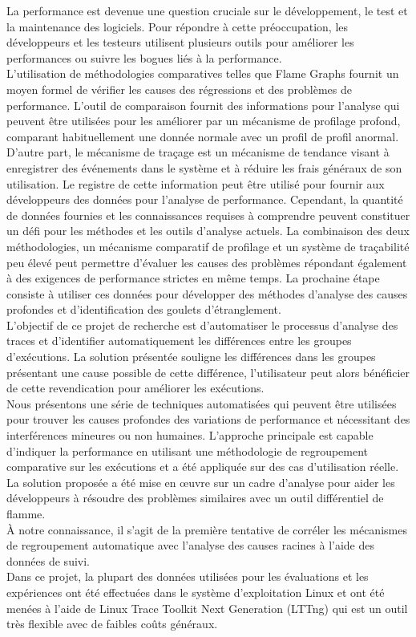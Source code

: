 La performance est devenue une question cruciale sur le développement, le test et la maintenance des logiciels. Pour répondre à cette préoccupation, les développeurs et les testeurs utilisent plusieurs outils pour améliorer les performances ou suivre les bogues liés à la performance.\\
L'utilisation de méthodologies comparatives telles que Flame Graphs fournit un moyen formel de vérifier les causes des régressions et des problèmes de performance. L'outil de comparaison fournit des informations pour l'analyse qui peuvent être utilisées pour les améliorer par un mécanisme de profilage profond, comparant habituellement une donnée normale avec un profil de profil anormal.\\
D'autre part, le mécanisme de traçage est un mécanisme de tendance visant à enregistrer des événements dans le système et à réduire les frais généraux de son utilisation. Le registre de cette information peut être utilisé pour fournir aux développeurs des données pour l'analyse de performance. Cependant, la quantité de données fournies et les connaissances requises à comprendre peuvent constituer un défi pour les méthodes et les outils d'analyse actuels.
La combinaison des deux méthodologies, un mécanisme comparatif de profilage et un système de traçabilité peu élevé peut permettre d'évaluer les causes des problèmes répondant également à des exigences de performance strictes en même temps. La prochaine étape consiste à utiliser ces données pour développer des méthodes d'analyse des causes profondes et d'identification des goulets d'étranglement.\\
L'objectif de ce projet de recherche est d'automatiser le processus d'analyse des traces et d'identifier automatiquement les différences entre les groupes d'exécutions. La solution présentée souligne les différences dans les groupes présentant une cause possible de cette différence, l'utilisateur peut alors bénéficier de cette revendication pour améliorer les exécutions.\\
Nous présentons une série de techniques automatisées qui peuvent être utilisées pour trouver les causes profondes des variations de performance et nécessitant des interférences mineures ou non humaines. L'approche principale est capable d'indiquer la performance en utilisant une méthodologie de regroupement comparative sur les exécutions et a été appliquée sur des cas d'utilisation réelle. La solution proposée a été mise en œuvre sur un cadre d'analyse pour aider les développeurs à résoudre des problèmes similaires avec un outil différentiel de flamme.\\
À notre connaissance, il s'agit de la première tentative de corréler les mécanismes de regroupement automatique avec l'analyse des causes racines à l'aide des données de suivi.\\
Dans ce projet, la plupart des données utilisées pour les évaluations et les expériences ont été effectuées dans le système d'exploitation Linux et ont été menées à l'aide de Linux Trace Toolkit Next Generation (LTTng) qui est un outil très flexible avec de faibles coûts généraux.